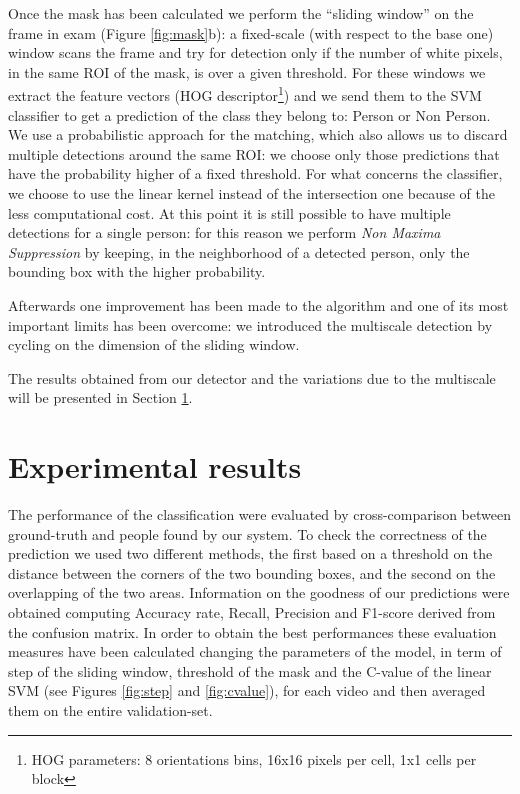 \documentclass[a4paper, 11pt, onecolumn]{article} %
\begin{document}
Once the mask has been calculated we perform the ``sliding window'' on the frame in exam (Figure \ref{fig:mask}b): a fixed-scale (with respect to the base one) window scans the frame and try for detection only if the number of white pixels, in the same ROI of the mask, is over a given threshold. For these windows we extract the feature vectors (HOG descriptor\footnote{HOG parameters: 8 orientations bins, 16x16 pixels per cell, 1x1 cells per block}) and we send them to the SVM classifier to get a prediction of the class they belong to: Person or Non Person. We use a probabilistic approach for the matching, which also allows us to discard multiple detections around the same ROI: we choose only those predictions that have the probability higher of a fixed threshold. For what concerns the classifier, we choose to use the linear kernel instead of the intersection one because of the less computational cost. At this point it is still possible to have multiple detections for a single person: for this reason we perform \emph{Non Maxima Suppression} by keeping, in the neighborhood  of a detected person, only the bounding box with the higher probability.

Afterwards one improvement has been made to the algorithm and one of its most important limits has been overcome: we introduced the multiscale detection by cycling on the dimension of the sliding window. 

The results obtained from our detector and the variations due to the multiscale will be presented in Section \ref{results}.




\section{Experimental results}\label{results}
The performance of the classification were evaluated by cross-comparison between ground-truth and people found by our system. To check the correctness of the prediction we used two different methods, the first based on a threshold on the distance between the corners of the two bounding boxes, and the second on the overlapping of the two areas. Information on the goodness of our predictions were obtained computing Accuracy rate, Recall, Precision and F1-score derived from the confusion matrix. In order to obtain the best performances these evaluation measures have been calculated changing the parameters of the model, in term of step of the sliding window, threshold of the mask and the C-value of the linear SVM (see Figures \ref{fig:step} and \ref{fig:cvalue}), for each video and then averaged them on the entire validation-set.
\end{document}
